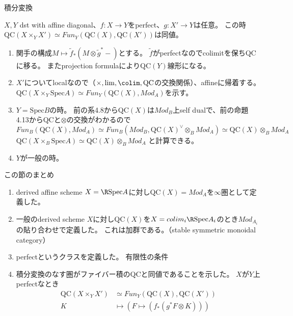 \documentclass[dvipdfmx]{beamer}
\newcommand{\QC}{\mathrm{QC}}
\newcommand{\spec}{\mathrm{Spec}}
\begin{document}
\begin{frame}{積分変換}
\begin{thm}[BFNのTheorem 4.14]
$X, Y$ dst with affine diagonal、$f:X \to Y$をperfect、$g:X' \to Y$は任意。
この時$\QC (X \times_Y X') \simeq Fun_Y(\QC(X),\QC(X'))$は同値。
\end{thm}
\begin{enumerate}
\item 関手の構成$M\mapsto \tilde{f}_*(M\otimes\tilde{g}^*-)$とする。
$\tilde{f}$がperfectなのでcolimitを保ち$\QC$に移る。
またprojection formulaにより$\QC(Y)$線形になる。

\item $X'$についてlocalなので（$\times, \lim, \colim, \QC$の交換関係）、affineに帰着する。
$\QC(X\times_Y\spec A) \simeq Fun_Y(\QC(X),Mod_A)$を示す。

\item $Y=\spec B$の時。
前の系4.8から$\QC(X)$は$Mod_B$上self dualで、前の命題4.13から$\QC$と$\otimes$の交換がわかるので
$Fun_B(\QC(X),Mod_A)\simeq Fun_B(Mod_B,\QC(X)^\vee\otimes_BMod_A)\simeq \QC(X)\otimes_BMod_A$
$\QC(X\times_B\spec A)\simeq \QC(X)\otimes_BMod_A$
と計算できる。

\item $Y$が一般の時。
\end{enumerate}
\end{frame}

\begin{frame}{この節のまとめ}
\begin{enumerate}
\item derived affine scheme $X=\R \spec A$に対し$\QC(X)=Mod_A$を$\infty$圏として定義した。

\item 一般のderived scheme $X$に対し$\QC(X)$を$X=colim_i\R \spec A_i$のとき$Mod_{A_i}$の貼り合わせで定義した。
これは加群である。（stable symmetric monoidal category）

\item perfectというクラスを定義した。
有限性の条件

\item 積分変換のなす圏がファイバー積の$\QC$と同値であることを示した。
$X$が$Y$上perfectなとき
\begin{align*}
\QC(X\times_YX') &\simeq Fun_Y(\QC(X), \QC(X'))\\
K &\mapsto (F \mapsto (f_*(g^*F\otimes K)))
\end{align*}
\end{enumerate}
\end{frame}
\end{document}
